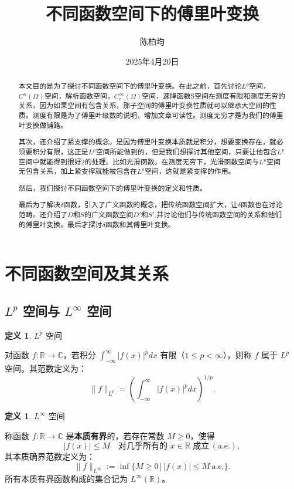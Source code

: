 \documentclass[12pt,a4paper]{article}
\title{不同函数空间下的傅里叶变换}
\author{陈柏均}
\date{2025年4月20日}
\theoremstyle{plain}
\theoremstyle{definition}
\newtheorem{definition}[theorem]{定义}
\theoremstyle{remark}
\begin{document}
	\maketitle
		\begin{abstract}
		本文目的是为了探讨不同函数空间下的傅里叶变换。在此之前，首先讨论$L^p$空间，$C^n(\Omega)$空间，解析函数空间，$C_c^\infty(\Omega)$空间，速降函数S空间在测度有限和测度无穷的关系，因为如果空间有包含关系，那子空间的傅里叶变换性质就可以继承大空间的性质。测度有限是为了傅里叶级数的说明，增加文章可读性。测度无穷才是为我们的傅里叶变换做铺路。
		
		其次，还介绍了紧支撑的概念。是因为傅里叶变换本质就是积分，想要变换存在，就必须要积分有限，这正是$L^p$空间所能做到的，但是我们想探讨其他空间，只要让他包含$L^p$空间中就能得到很好2的处理。比如光滑函数。在测度无穷下，光滑函数空间与$L^p$空间无包含关系，加上紧支撑就能被包含在$L^p$空间，这就是紧支撑的作用。
		
		然后，我们探讨不同函数空间下的傅里叶变换的定义和性质。
		
	    最后为了解决$\delta$函数，引入了广义函数的概念，把传统函数空间扩大，让$\delta$函数也在讨论范畴。还介绍了$D$和$S$的广义函数空间$D'$和$S'$,并讨论他们与传统函数空间的关系和他们的傅里叶变换。最后才探讨$\delta$函数和其傅里叶变换。
	\end{abstract}
	\newpage
	
		\tableofcontents
	\clearpage
	
	
	\section{不同函数空间及其关系}
	\subsection{\texorpdfstring{$L^p$}{Lp} 空间与 \texorpdfstring{$L^\infty$}{L∞} 空间}
	
	\begin{definition}$L^p$ 空间
		
		对函数 $f: \mathbb{R} \to \mathbb{C}$，若积分 $\int_{-\infty}^\infty |f(x)|^p dx$ 有限（$1 \leq p < \infty$），则称 $f$ 属于 $L^p$ 空间。其范数定义为：
		\[
		\|f\|_{L^p} = \left( \int_{-\infty}^\infty |f(x)|^p dx \right)^{1/p}.
		\]
	\end{definition}
	
\begin{definition}$L^\infty$ 空间
	
	称函数 $f: \mathbb{R} \to \mathbb{C}$ 是\textbf{本质有界}的，若存在常数 $M \geq 0$，使得
	\[
	|f(x)| \leq M \quad \text{对几乎所有的 } x \in \mathbb{R} \text{ 成立} \, (\text{a.e.}),
	\]
	其本质确界范数定义为：
	\[
	\|f\|_{L^\infty} := \inf \big\{ M \geq 0 \,\big|\, |f(x)| \leq M \ \text{a.e.} \big\}.
	\]
	所有本质有界函数构成的集合记为 $L^\infty(\mathbb{R})$。
\end{definition}
	
\end{document}
